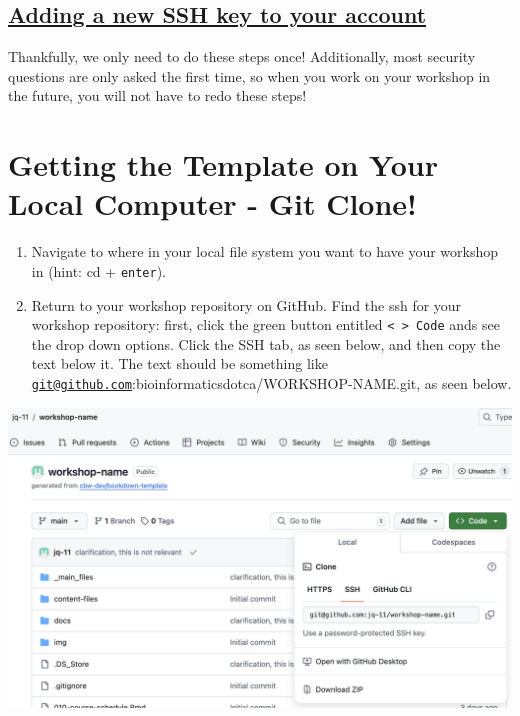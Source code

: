 \documentclass[
]{book}
\theoremstyle{definition}
\theoremstyle{definition}
\theoremstyle{definition}
\theoremstyle{definition}
\theoremstyle{remark}
\begin{document}
\subsection{\texorpdfstring{\href{https://docs.github.com/en/authentication/connecting-to-github-with-ssh/adding-a-new-ssh-key-to-your-github-account\#adding-a-new-ssh-key-to-your-account}{Adding a new SSH key to your account}}{Adding a new SSH key to your account}}\label{adding-a-new-ssh-key-to-your-account}

Thankfully, we only need to do these steps once! Additionally, most security questions are only asked the first time, so when you work on your workshop in the future, you will not have to redo these steps!

\section{Getting the Template on Your Local Computer - Git Clone!}\label{git-clone}

\begin{enumerate}
\def\labelenumi{\arabic{enumi}.}
\item
  Navigate to where in your local file system you want to have your workshop in (hint: cd + \texttt{enter}).
\item
  Return to your workshop repository on GitHub. Find the ssh for your workshop repository: first, click the green button entitled \texttt{\textless{}\ \textgreater{}\ Code} ands see the drop down options. Click the SSH tab, as seen below, and then copy the text below it. The text should be something like \href{mailto:git@github.com}{\nolinkurl{git@github.com}}:bioinformaticsdotca/WORKSHOP-NAME.git, as seen below.
\end{enumerate}

\includegraphics{img/git-instruct/copy-ssh.png}\\
\end{document}
